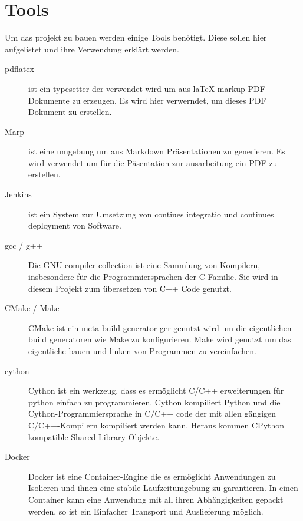 \chapter{Tools}

Um das projekt zu bauen werden einige Tools benötigt. Diese sollen hier aufgelistet und ihre Verwendung erklärt werden.

\begin{description}
    \item[pdflatex] ist ein typesetter der verwendet wird um aus laTeX markup PDF Dokumente zu erzeugen. Es wird hier verwerndet, um dieses PDF Dokument zu erstellen.
    \item[Marp] ist eine  umgebung um aus Markdown Präsentationen zu generieren. Es wird verwendet um für die Päsentation zur ausarbeitung ein PDF zu erstellen.
    \item[Jenkins] ist ein System zur Umsetzung von \glqq contiues integratio \grqq{} und \glqq continues deployment\grqq{} von Software.
    \item[gcc / g++] Die GNU compiler collection ist eine Sammlung von Kompilern, insbesondere für die Programmiersprachen der C Familie. Sie wird in diesem Projekt zum übersetzen von C++ Code genutzt.
    \item[CMake / Make] CMake ist ein meta build generator ger genutzt wird um die eigentlichen build generatoren wie Make zu konfigurieren. Make wird genutzt um das eigentliche bauen und linken von Programmen zu vereinfachen.
    \item[cython] Cython ist ein werkzeug, dass es ermöglicht C/C++ erweiterungen für python einfach zu programmieren. Cython kompiliert Python und die Cython-Programmiersprache in C/C++ code der mit allen gängigen C/C++-Kompilern kompiliert werden kann. Heraus kommen CPython kompatible Shared-Library-Objekte.
    \item[Docker] Docker ist eine Container-Engine die es ermöglicht Anwendungen zu Isolieren und ihnen eine stabile Laufzeitumgebung zu garantieren. In einen Container kann eine Anwendung mit all ihren Abhängigkeiten gepackt werden, so ist ein Einfacher Transport und Auslieferung möglich.
\end{description}
